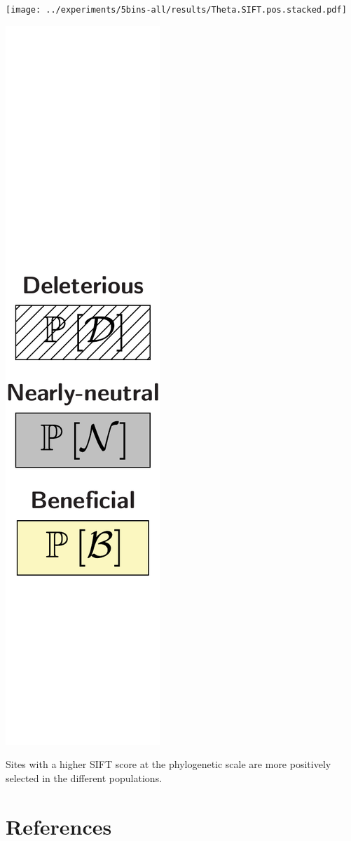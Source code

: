 \documentclass{article}
\begin{document}
\begin{center}
\begin{minipage}{0.09\linewidth}
        \end{minipage}
        \begin{minipage}{0.9\linewidth}
            \texttt{[image: ../experiments/5bins-all/results/Theta.SIFT.pos.stacked.pdf]}
        \end{minipage}
        \begin{minipage}{0.09\linewidth}
            \includegraphics[width=\linewidth, page=1]{artworks/legend.polycat}
        \end{minipage}
    \end{center}
    Sites with a higher SIFT score at the phylogenetic scale are more positively selected in the different populations.

    \section*{References}
    \printbibliography
\end{document}
